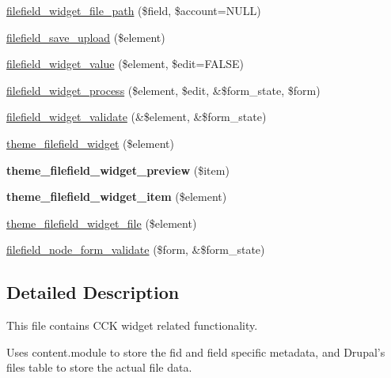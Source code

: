 \begin{CompactItemize}
\item 
\hyperlink{filefield__widget_8inc_0f015f9e3d585ea916f6fb8999543043}{filefield\_\-widget\_\-file\_\-path} (\$field, \$account=NULL)
\item 
\hyperlink{filefield__widget_8inc_d24461bcec49edffb02fec77e15c85f2}{filefield\_\-save\_\-upload} (\$element)
\item 
\hyperlink{filefield__widget_8inc_3081760b9137ee464d84213644278ae6}{filefield\_\-widget\_\-value} (\$element, \$edit=FALSE)
\item 
\hyperlink{filefield__widget_8inc_45936448da9575c4ec10adb0e46e97e3}{filefield\_\-widget\_\-process} (\$element, \$edit, \&\$form\_\-state, \$form)
\item 
\hyperlink{filefield__widget_8inc_2db56b57675267528a5cc3cbcc9b9ff2}{filefield\_\-widget\_\-validate} (\&\$element, \&\$form\_\-state)
\item 
\hyperlink{filefield__widget_8inc_b61afc416bab06c537321d636e1cc47b}{theme\_\-filefield\_\-widget} (\$element)
\item 
\hypertarget{filefield__widget_8inc_d82946921f996f1fe51bd0c0b279959c}{
\textbf{theme\_\-filefield\_\-widget\_\-preview} (\$item)}
\label{filefield__widget_8inc_d82946921f996f1fe51bd0c0b279959c}

\item 
\hypertarget{filefield__widget_8inc_4a4e73d24bbe522401a76c5d98f0cff4}{
\textbf{theme\_\-filefield\_\-widget\_\-item} (\$element)}
\label{filefield__widget_8inc_4a4e73d24bbe522401a76c5d98f0cff4}

\item 
\hyperlink{filefield__widget_8inc_aac3ac93a565ef418ae15d070fbc4625}{theme\_\-filefield\_\-widget\_\-file} (\$element)
\item 
\hyperlink{filefield__widget_8inc_37900bfc24e625df1de43f4b11ab8d7d}{filefield\_\-node\_\-form\_\-validate} (\$form, \&\$form\_\-state)
\end{CompactItemize}


\subsection{Detailed Description}
This file contains CCK widget related functionality.

Uses content.module to store the fid and field specific metadata, and Drupal's files table to store the actual file data. 

